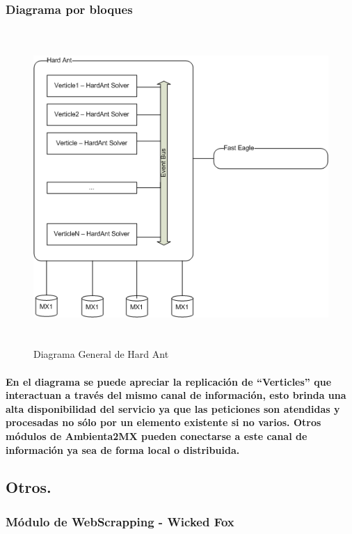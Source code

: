     \subsubsection{Diagrama por bloques}
      \newpage
        \begin{landscape}
          \begin{figure}[h!]
          \centering
          \includegraphics[width=22.5cm,height=12cm]{./images/DiagramaHardAnt.png}
          \caption{Diagrama General de Hard Ant}
        \end{figure}
        \end{landscape}
      \newpage
    \paragraph{En el diagrama se puede apreciar la replicación de ``Verticles'' que interactuan a través del mismo canal de información, esto brinda una alta disponibilidad del servicio ya que las peticiones son atendidas y procesadas no sólo por un elemento existente si no varios. Otros módulos de Ambienta2MX pueden conectarse a este canal de información ya sea de forma local o distribuida.}
  \subsection{Otros.}
    \subsubsection{Módulo de WebScrapping - Wicked Fox}
